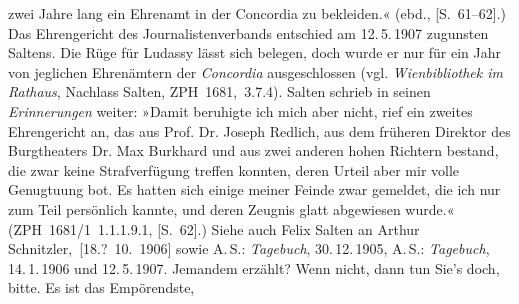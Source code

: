 \begin{ledgroupsized}[t]{13cm}
{{{                     zwei Jahre lang ein Ehrenamt in der Concordia zu bekleiden.« (ebd., [S. 61–62].) Das Ehrengericht des
                     Journalistenverbands
                  entschied am 12. 5. 1907 zugunsten Saltens.
                  Die Rüge für Ludassy lässt sich belegen,
                  doch wurde er nur für ein Jahr von jeglichen Ehrenämtern der \emph{Concordia} ausgeschlossen (vgl.
                        \emph{Wienbibliothek im Rathaus}, Nachlass Salten, ZPH 1681, 3.7.4). Salten schrieb in seinen \emph{Erinnerungen} weiter: »Damit beruhigte ich mich aber nicht, rief
                     ein zweites Ehrengericht an, das aus Prof. Dr. Joseph Redlich, aus dem früheren Direktor des Burgtheaters Dr. Max Burkhard und aus zwei anderen hohen Richtern
                     bestand, die zwar keine Strafverfügung treffen konnten, deren Urteil aber mir
                     volle Genugtuung bot. Es hatten sich einige meiner Feinde zwar gemeldet, die
                     ich nur zum Teil persönlich kannte, und deren Zeugnis glatt abgewiesen
                     wurde.« (ZPH 1681/1 1.1.1.9.1, [S. 62].) Siehe auch Felix Salten an Arthur Schnitzler, [18.? 10. 1906] sowie A. S.: \emph{Tagebuch}, 30. 12. 1905, A. S.: \emph{Tagebuch}, 14. 1. 1906 und 12. 5. 1907.}}}\label{K_L03415-6h}
               Jemandem erzählt? Wenn nicht, dann tun Sie’s doch, bitte. Es ist das Empörendste,

\end{ledgroupsized}
